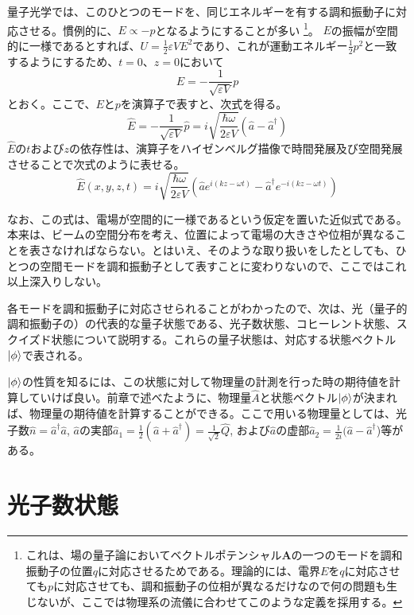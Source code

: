 量子光学では、このひとつのモードを、同じエネルギーを有する調和振動子に対応させる。慣例的に、$E \propto -p$となるようにすることが多い
\footnote{これは、場の量子論においてベクトルポテンシャル$\pmb A$の一つのモードを調和振動子の位置$q$に対応させるためである。理論的には、電界$E$を$q$に対応させても$p$に対応させても、調和振動子の位相が異なるだけなので何の問題も生じないが、ここでは物理系の流儀に合わせてこのような定義を採用する。}。
$E$の振幅が空間的に一様であるとすれば、$U = \frac 1 2 \varepsilon V E^2$であり、これが運動エネルギー$\frac 1 2 p^2$と一致するようにするため、$t = 0$、$z = 0$において
\begin{equation}
  E = -\frac 1 {\sqrt {\varepsilon V}}p
\end{equation}
とおく。ここで、$E$と$p$を演算子で表すと、次式を得る。
\begin{equation}
  \hat E = -\frac 1 {\sqrt{\varepsilon V}}\hat p = i\sqrt{\frac{\hbar \omega}{2\varepsilon V}}(\hat a - \hat a^\dagger)
\end{equation}
$\hat E$の$t$および$z$の依存性は、演算子をハイゼンベルグ描像で時間発展及び空間発展させることで次式のように表せる。
\begin{equation}
  \hat E(x,y,z,t) = i\sqrt{\frac{\hbar \omega}{2\varepsilon V}}(\hat a e^{i(kz-\omega t)} - \hat a^\dagger e^{-i(kz-\omega t)})
\end{equation}

なお、この式は、電場が空間的に一様であるという仮定を置いた近似式である。本来は、ビームの空間分布を考え、位置によって電場の大きさや位相が異なることを表さなければならない。とはいえ、そのような取り扱いをしたとしても、ひとつの空間モードを調和振動子として表すことに変わりないので、ここではこれ以上深入りしない。

各モードを調和振動子に対応させられることがわかったので、次は、光（量子的調和振動子の）の代表的な量子状態である、光子数状態、コヒーレント状態、スクイズド状態について説明する。これらの量子状態は、対応する状態ベクトル$\ket \phi$で表される。

$\ket \phi$の性質を知るには、この状態に対して物理量の計測を行った時の期待値を計算していけば良い。前章で述べたように、物理量$\hat A$と状態ベクトル$\ket \phi$が決まれば、物理量の期待値を計算することができる。ここで用いる物理量としては、光子数$\hat n = \hat a^\dagger \hat a$, $\hat a$の実部$\hat a_1 = \frac{1}{2}(\hat a + \hat a^\dagger) = \frac{1}{\sqrt 2}\hat Q$, および$\hat a$の虚部$\hat a_2 = \frac{1}{2i}(\hat a - \hat a^\dagger$)等がある。


\section{光子数状態}

